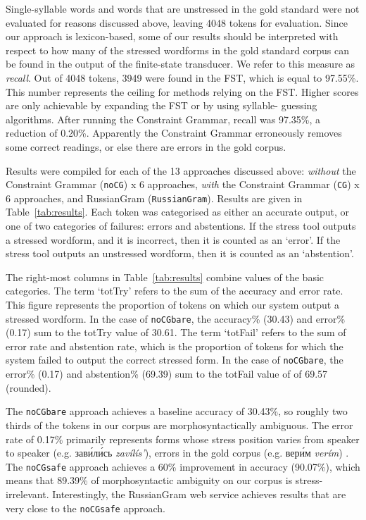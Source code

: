 \documentclass[11pt]{article}
\newcommand{\rus}[1]{\foreignlanguage{russian}{#1}}
\newcommand{\rr}[1]{\marginpar{\scriptsize R: #1}} %
\begin{document}
Single-syllable words and words that are unstressed in the gold standard were
not evaluated for reasons discussed above, leaving 4048 tokens for evaluation.
Since our approach is lexicon-based, some of our results should be interpreted
with respect to how many of the stressed wordforms in the gold standard corpus
can be found in the output of the finite-state transducer. We refer to this 
measure as \emph{recall}. Out of 4048 tokens, 3949 were 
found in the FST, which is equal to 97.55\%.
This number represents the ceiling for methods relying on the FST.
Higher scores are only achievable by expanding the FST or by using syllable-
guessing algorithms. After running the Constraint Grammar, recall was 97.35\%, 
a reduction of 0.20\%. Apparently the Constraint Grammar erroneously removes some 
correct readings, or else there are errors in the gold corpus.

Results were compiled for each of the 13 approaches discussed above: 
\emph{without} the Constraint Grammar ({\small {\tt noCG}}) x 6 approaches, 
\emph{with} the Constraint Grammar ({\small {\tt CG}}) x 6 approaches, 
and RussianGram ({\small {\tt RussianGram}}). Results are given in 
Table~\ref{tab:results}. Each token was categorised as either an accurate output, 
or one of two categories of failures: errors and abstentions. 
If the stress tool outputs a stressed wordform, and it is incorrect, then it is
counted as an `error'. If the stress tool outputs an unstressed wordform, then
it is counted as an `abstention'.

The right-most columns in 
Table~\ref{tab:results} combine values of the basic categories. The term `totTry' 
refers to the sum of the accuracy and error rate. This figure represents the 
proportion of tokens on which our system output a stressed wordform. In the case 
of {\small {\tt noCGbare}}, the accuracy\% (30.43) and error\% (0.17) sum to the 
totTry value of 30.61. The term `totFail' refers to the sum of error rate 
and abstention rate, which is the 
proportion of tokens for which the system failed to output the correct stressed 
form. In the case of {\small {\tt noCGbare}}, the error\% (0.17) 
and abstention\% (69.39) sum to the totFail value of of 69.57 (rounded). 

\rr{Are differences significant?}

The {\small {\tt noCGbare}} approach achieves a baseline accuracy of
30.43\%, so roughly two thirds of the tokens in our corpus are
morphosyntactically ambiguous. The error rate of 0.17\% primarily represents 
forms whose stress position varies from speaker to speaker (e.g.
\rus{зав\'{и}л\'{и}сь} \emph{zav\'{i}l\'{i}s'}), errors in the gold corpus (e.g. 
\rus{вер\'{и}м} \emph{ver\'{i}m}) . The {\small {\tt noCGsafe}} approach
achieves a 60\% improvement in accuracy (90.07\%), which means that 89.39\% of 
morphosyntactic ambiguity on our corpus is stress-irrelevant. Interestingly, the 
RussianGram web service achieves results that are very close 
to the {\small {\tt noCGsafe}} approach.
\end{document}
